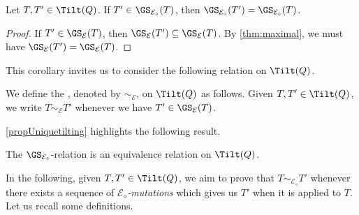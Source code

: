 \begin{cor}\label{propUniquetilting}
Let $T,T' \in \Tilt(Q)$. If $T' \in \GS_{\mathcal{E}_\diamond}(T)$, then $\GS_{\mathcal{E}_\diamond}(T') = \GS_{\mathcal{E}_\diamond}(T)$. 
\end{cor}

\begin{proof}
If $T' \in \GS_\mathcal{E}(T)$, then $\GS_\mathcal{E}(T') \subseteq \GS_\mathcal{E}(T)$. By \cref{thm:maximal}, we must have $\GS_\mathcal{E}(T') = \GS_\mathcal{E}(T)$.
\end{proof}

This corollary invites us to consider the following relation on $\Tilt(Q)$.

\begin{definition} \label{def:GSErelation}
    We define the , denoted by $\sim_{\mathcal{E}}$, on $\Tilt(Q)$ as follows. Given $T,T' \in \Tilt(Q)$, we write $T \sim_{\mathcal{E}} T'$ whenever we have $T' \in \GS_{\mathcal{E}}(T)$.
\end{definition}

\cref{propUniquetilting} highlights the following result.

\begin{cor} \label{def:GSEdiamondrel}
   The $\GS_{\mathcal{E}_\diamond}$-relation is an equivalence relation on $\Tilt(Q)$. 
\end{cor}

In the following, given $T,T' \in \Tilt(Q)$, we aim to prove that $T \sim_{\mathcal{E}_\diamond} T'$ whenever there exists a sequence of \emph{$\mathcal{E}_\diamond$-mutations} which gives us $T'$ when it is applied to $T$. Let us recall some definitions.

